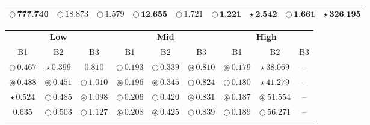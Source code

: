 \documentclass[
]{article}
\begin{document}
\begin{table}[!h]
\begin{tabular}[t]{ccccccccc}
\cellcolor[HTML]{F5C710}$\bigcirc\,\textbf{777.740}$ & \cellcolor[HTML]{FFFFFF}$\bigcirc\,18.873$ & \cellcolor[HTML]{FFFFFF}$\bigcirc\,1.579$ & \cellcolor[HTML]{F5C710}$\bigcirc\,\textbf{12.655}$ & \cellcolor[HTML]{FFFFFF}$\bigcirc\,1.721$ & \cellcolor[HTML]{F5C710}$\bigcirc\,\textbf{1.221}$ & \cellcolor[HTML]{F5C710}$\star\,\textbf{2.542}$ & \cellcolor[HTML]{F5C710}$\bigcirc\,\textbf{1.661}$ & \cellcolor[HTML]{DF536B}$\star\,\textbf{326.195}$\\
\bottomrule
\end{tabular}
\end{table}

\begin{table}[!h]
\centering
\begin{tabular}[t]{ccccccccc}
\toprule
\multicolumn{3}{c}{\textbf{Low}} & \multicolumn{3}{c}{\textbf{Mid}} & \multicolumn{3}{c}{\textbf{High}} \\
\cmidrule(l{3pt}r{3pt}){1-3} \cmidrule(l{3pt}r{3pt}){4-6} \cmidrule(l{3pt}r{3pt}){7-9}
B1 & B2 & B3 & B1 & B2 & B3 & B1 & B2 & B3\\
\midrule
\cellcolor[HTML]{F5C710}$\bigcirc\,\textit{0.467}$ & \cellcolor[HTML]{F5C710}$\star\,\textit{0.399}$ & \cellcolor[HTML]{FFFFFF}$0.810$ & \cellcolor[HTML]{DF536B}$\bigcirc\,\textit{0.193}$ & \cellcolor[HTML]{DF536B}$\bigcirc\,\textit{0.339}$ & \cellcolor[HTML]{DF536B}$\circledast\,\textit{0.810}$ & \cellcolor[HTML]{2297E6}$\circledast\,\textit{0.179}$ & \cellcolor[HTML]{2297E6}$\star\,\textit{38.069}$ & --\\
\cellcolor[HTML]{F5C710}$\circledast\,\textit{0.488}$ & \cellcolor[HTML]{F5C710}$\circledast\,\textit{0.451}$ & \cellcolor[HTML]{F5C710}$\bigcirc\,\textit{1.010}$ & \cellcolor[HTML]{DF536B}$\circledast\,\textit{0.196}$ & \cellcolor[HTML]{DF536B}$\circledast\,\textit{0.345}$ & \cellcolor[HTML]{DF536B}$\bigcirc\,\textit{0.824}$ & \cellcolor[HTML]{2297E6}$\bigcirc\,\textit{0.180}$ & \cellcolor[HTML]{DF536B}$\star\,\textit{41.279}$ & --\\
\cellcolor[HTML]{F5C710}$\star\,\textit{0.524}$ & \cellcolor[HTML]{F5C710}$\bigcirc\,\textit{0.485}$ & \cellcolor[HTML]{2297E6}$\circledast\,\textit{1.098}$ & \cellcolor[HTML]{2297E6}$\bigcirc\,\textit{0.206}$ & \cellcolor[HTML]{2297E6}$\bigcirc\,\textit{0.420}$ & \cellcolor[HTML]{2297E6}$\circledast\,\textit{0.831}$ & \cellcolor[HTML]{DF536B}$\circledast\,\textit{0.187}$ & \cellcolor[HTML]{DF536B}$\circledast\,\textit{51.554}$ & --\\
\cellcolor[HTML]{FFFFFF}$0.635$ & \cellcolor[HTML]{2297E6}$\bigcirc\,\textit{0.503}$ & \cellcolor[HTML]{2297E6}$\bigcirc\,\textit{1.127}$ & \cellcolor[HTML]{2297E6}$\circledast\,\textit{0.208}$ & \cellcolor[HTML]{2297E6}$\circledast\,\textit{0.425}$ & \cellcolor[HTML]{2297E6}$\bigcirc\,\textit{0.839}$ & \cellcolor[HTML]{DF536B}$\bigcirc\,\textit{0.189}$ & \cellcolor[HTML]{DF536B}$\bigcirc\,\textit{56.271}$ & --\\

\end{tabular}
\end{table}
\end{document}
